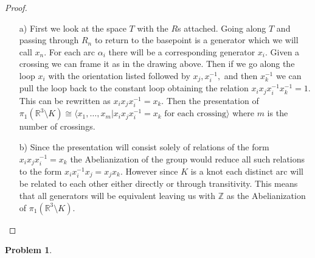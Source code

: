\documentclass[10pt]{article}
\newcommand{\sk}{\vskip 10mm}
\newcommand{\bb}[1]{\mathbb{#1}}
\theoremstyle{plain}
\newtheorem{problem}{Problem}
\theoremstyle{remark}
\begin{document}
\begin{proof}
  \begin{itemize}
  \item[a)]
    First we look at the space $T$ with the $R$s attached. Going along
    $T$ and passing through $R_n$ to return to the basepoint is a generator
    which we will call $x_n$. For each arc $\alpha_i$ there will be a
    corresponding generator $x_i$. Given a crossing we can frame it as in
    the drawing above. Then if we go along the loop $x_i$ with the orientation
    listed followed by $x_j,x_i^{-1},$ and then $x_k^{-1}$ we can pull
    the loop back to the constant loop obtaining the relation $x_ix_jx_i^{-1}x_k^{-1}=1$.
    This can be rewritten as $x_ix_jx_i^{-1}=x_k$. Then the presentation
    of $\pi_1(\bb{R}^3\setminus K)\cong\langle x_1,\ldots,x_m|x_ix_jx_i^{-1}=x_k \text{\ for each crossing}\rangle$
    where $m$ is the number of crossings.
  \item[b)] Since the presentation will consist solely of relations of the
    form $x_ix_jx_i^{-1}=x_k$ the Abelianization of the group would reduce
    all such relations to the form $x_ix_i^{-1}x_j=x_jx_k$. However since $K$ is a knot each
    distinct arc will be related to each other either directly or through
    transitivity. This means that all generators will be equivalent leaving
    us with $\bb{Z}$ as the Abelianization of $\pi_1(\bb{R}^3\setminus K)$.
  \end{itemize}
\end{proof}

\sk

\begin{problem} %
  
\end{problem}
\end{document}
